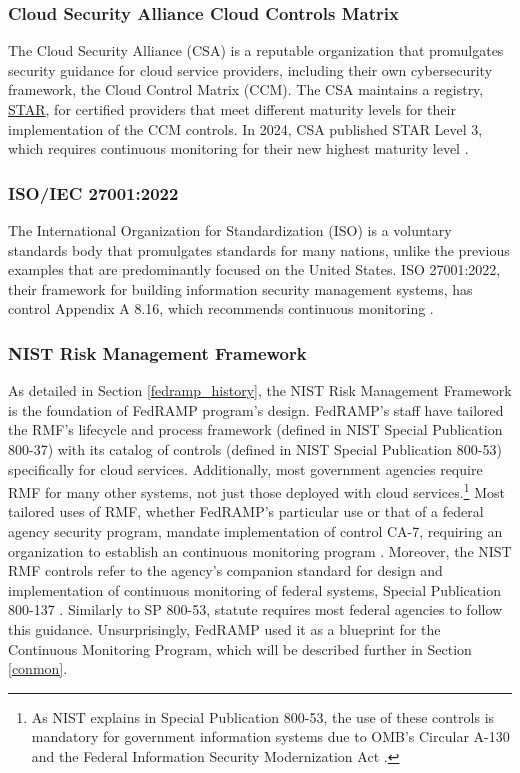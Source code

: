 \documentclass{jdf}
\begin{document}
\subsubsection{Cloud Security Alliance Cloud Controls Matrix}

The Cloud Security Alliance (CSA) is a reputable organization that promulgates security guidance for cloud service providers, including their own cybersecurity framework, the Cloud Control Matrix (CCM). The CSA maintains a registry, \href{https://cloudsecurityalliance.org/star/registry}{STAR}, for certified providers that meet different maturity levels for their implementation of the CCM controls. In 2024, CSA published STAR Level 3, which requires continuous monitoring for their new highest maturity level \citeyear{csa_starl3_21}.

\subsubsection{ISO/IEC 27001:2022}

The International Organization for Standardization (ISO) is a voluntary standards body that promulgates standards for many nations, unlike the previous examples that are predominantly focused on the United States. ISO 27001:2022, their framework for building information security management systems, has control Appendix A 8.16, which recommends continuous monitoring \citeyear{iso27001_22}.

\subsubsection{NIST Risk Management Framework} \label{rmf}

As detailed in Section \ref{fedramp_history}, the NIST Risk Management Framework is the foundation of FedRAMP program's design. FedRAMP's staff have tailored the RMF's lifecycle and process framework (defined in NIST Special Publication 800-37) with its catalog of controls (defined in NIST Special Publication 800-53) specifically for cloud services. Additionally, most government agencies require RMF for many other systems, not just those deployed with cloud services.\footnote{As NIST explains in Special Publication 800-53, the use of these controls is mandatory for government information systems due to OMB's Circular A-130 and the Federal Information Security Modernization Act \citeyear[p.~2]{sp80053r5}.} Most tailored uses of RMF, whether FedRAMP's particular use or that of a federal agency security program, mandate implementation of control CA-7, requiring an organization to establish an continuous monitoring program \citeyear[pp.~90-91]{sp80053r5}. Moreover, the NIST RMF controls refer to the agency's companion standard for design and implementation of continuous monitoring of federal systems, Special Publication 800-137 \citeyear{sp800137}. Similarly to SP 800-53, statute requires most federal agencies to follow this guidance. Unsurprisingly, FedRAMP used it as a blueprint for the Continuous Monitoring Program, which will be described further in Section \ref{conmon}.
\end{document}
